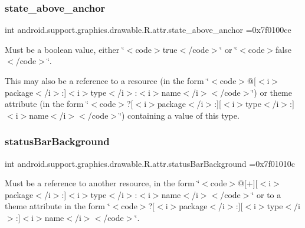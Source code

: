\subsubsection{\texorpdfstring{state\+\_\+above\+\_\+anchor}{state\_above\_anchor}}
{\footnotesize\ttfamily int android.\+support.\+graphics.\+drawable.\+R.\+attr.\+state\+\_\+above\+\_\+anchor =0x7f0100ce\hspace{0.3cm}{\ttfamily [static]}}

Must be a boolean value, either \char`\"{}$<$code$>$true$<$/code$>$\char`\"{} or \char`\"{}$<$code$>$false$<$/code$>$\char`\"{}. 

This may also be a reference to a resource (in the form \char`\"{}$<$code$>$@\mbox{[}$<$i$>$package$<$/i$>$\+:\mbox{]}$<$i$>$type$<$/i$>$\+:$<$i$>$name$<$/i$>$$<$/code$>$\char`\"{}) or theme attribute (in the form \char`\"{}$<$code$>$?\mbox{[}$<$i$>$package$<$/i$>$\+:\mbox{]}\mbox{[}$<$i$>$type$<$/i$>$\+:\mbox{]}$<$i$>$name$<$/i$>$$<$/code$>$\char`\"{}) containing a value of this type. \mbox{\label{classandroid_1_1support_1_1graphics_1_1drawable_1_1R_1_1attr_a003886c91c98b2d79fc47306239dae32}} 
\subsubsection{\texorpdfstring{status\+Bar\+Background}{statusBarBackground}}
{\footnotesize\ttfamily int android.\+support.\+graphics.\+drawable.\+R.\+attr.\+status\+Bar\+Background =0x7f01010c\hspace{0.3cm}{\ttfamily [static]}}

Must be a reference to another resource, in the form \char`\"{}$<$code$>$@\mbox{[}+\mbox{]}\mbox{[}$<$i$>$package$<$/i$>$\+:\mbox{]}$<$i$>$type$<$/i$>$\+:$<$i$>$name$<$/i$>$$<$/code$>$\char`\"{} or to a theme attribute in the form \char`\"{}$<$code$>$?\mbox{[}$<$i$>$package$<$/i$>$\+:\mbox{]}\mbox{[}$<$i$>$type$<$/i$>$\+:\mbox{]}$<$i$>$name$<$/i$>$$<$/code$>$\char`\"{}. \mbox{\label{classandroid_1_1support_1_1graphics_1_1drawable_1_1R_1_1attr_ae9af0f0a3043093340539f6d883bf012}} 
